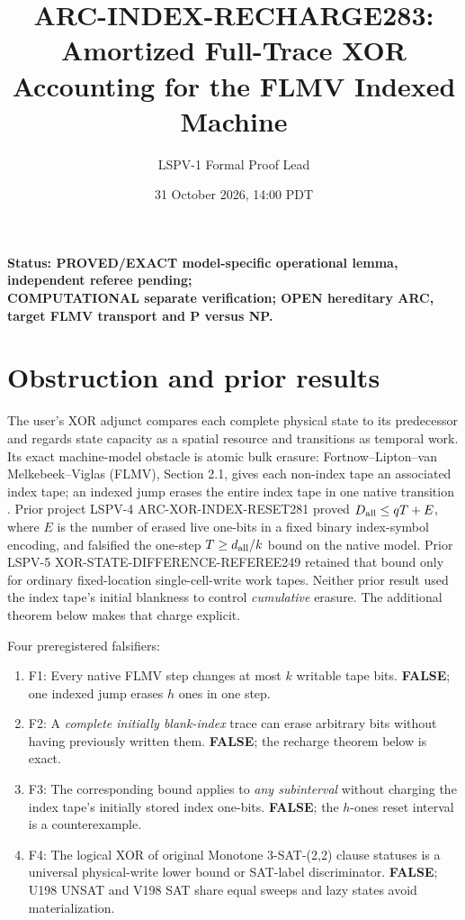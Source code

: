 \documentclass[11pt]{article}
\title{ARC-INDEX-RECHARGE283: Amortized Full-Trace XOR Accounting for the FLMV Indexed Machine}
\author{LSPV-1 Formal Proof Lead}
\date{31 October 2026, 14:00 PDT}
\begin{document}
\maketitle
\begin{center}\textbf{Status: PROVED/EXACT model-specific operational lemma, independent referee pending;}\\
\textbf{COMPUTATIONAL separate verification; OPEN hereditary ARC, target FLMV transport and P versus NP.}
\end{center}
\section{Obstruction and prior results}
The user's XOR adjunct compares each complete physical state to its predecessor and regards state capacity as a spatial resource and transitions as temporal work. Its exact machine-model obstacle is atomic bulk erasure: Fortnow--Lipton--van Melkebeek--Viglas (FLMV), Section 2.1, gives each non-index tape an associated index tape; an indexed jump erases the entire index tape in one native transition \cite{FLMV}. Prior project LSPV-4 ARC-XOR-INDEX-RESET281 proved $D_{\rm all}\le qT+E$, where $E$ is the number of erased live one-bits in a fixed binary index-symbol encoding, and falsified the one-step $T\ge d_{\rm all}/k$ bound on the native model. Prior LSPV-5 XOR-STATE-DIFFERENCE-REFEREE249 retained that bound only for ordinary fixed-location single-cell-write work tapes. Neither prior result used the index tape's initial blankness to control \emph{cumulative} erasure. The additional theorem below makes that charge explicit.

Four preregistered falsifiers:
\begin{enumerate}
\item[] F1: Every native FLMV step changes at most $k$ writable tape bits. \textbf{FALSE}; one indexed jump erases $h$ ones in one step.
\item[] F2: A \emph{complete initially blank-index} trace can erase arbitrary bits without having previously written them. \textbf{FALSE}; the recharge theorem below is exact.
\item[] F3: The corresponding bound applies to \emph{any subinterval} without charging the index tape's initially stored index one-bits. \textbf{FALSE}; the $h$-ones reset interval is a counterexample.
\item[] F4: The logical XOR of original Monotone 3-SAT-(2,2) clause statuses is a universal physical-write lower bound or SAT-label discriminator. \textbf{FALSE}; U198 UNSAT and V198 SAT share equal sweeps and lazy states avoid materialization.
\end{enumerate}
\end{document}
